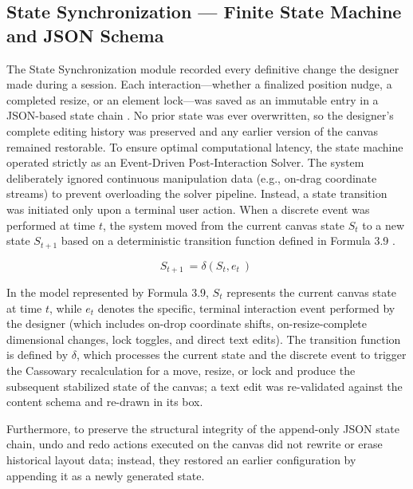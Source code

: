 \begin{refsection}
\subsection{State Synchronization — Finite State Machine and JSON Schema}
The State Synchronization module recorded every definitive change the designer made during a session. Each interaction—whether a finalized position nudge, a completed resize, or an element lock—was saved as an immutable entry in a JSON-based state chain \cite{Sabau2024RealTime}. No prior state was ever overwritten, so the designer's complete editing history was preserved and any earlier version of the canvas remained restorable. To ensure optimal computational latency, the state machine operated strictly as an Event-Driven Post-Interaction Solver. The system deliberately ignored continuous manipulation data (e.g., on-drag coordinate streams) to prevent overloading the solver pipeline. Instead, a state transition was initiated only upon a terminal user action. When a discrete event was performed at time $t$, the system moved from the current canvas state $S_t$ to a new state $S_{t+1}$ based on a deterministic transition function defined in Formula 3.9 \cite{Kleppmann2022CRDT}.

\begin{center}
\begin{minipage}{0.8\textwidth}
\begin{equation}
S_{t+1}\ =\delta(S_t,e_t\ )\ 
\end{equation}
\centering
\end{minipage}
\end{center}

In the model represented by Formula 3.9, $S_t$ represents the current canvas state at time $t$, while $e_t$ denotes the specific, terminal interaction event performed by the designer (which includes on-drop coordinate shifts, on-resize-complete dimensional changes, lock toggles, and direct text edits). The transition function is defined by $\delta$, which processes the current state and the discrete event to trigger the Cassowary recalculation for a move, resize, or lock and produce the subsequent stabilized state of the canvas; a text edit was re-validated against the content schema and re-drawn in its box.

Furthermore, to preserve the structural integrity of the append-only JSON state chain, undo and redo actions executed on the canvas did not rewrite or erase historical layout data; instead, they restored an earlier configuration by appending it as a newly generated state.   


\end{refsection}
